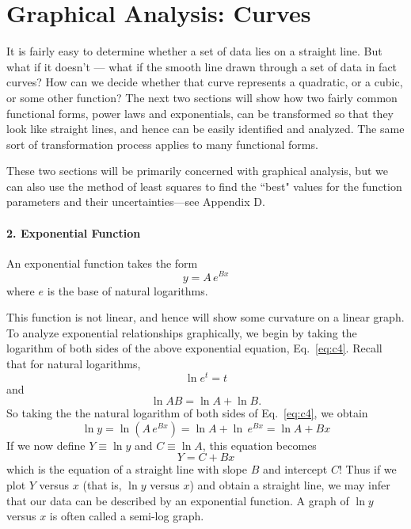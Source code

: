 \section*{Graphical Analysis: Curves}


    It is fairly easy to determine whether a set of data lies on
a straight line.  But what if it doesn't --- what if the smooth line
drawn through a set of data in fact curves?  How can we
decide whether that curve represents a quadratic, or a cubic, or
some other function?  The next two sections will show
how two fairly common functional forms, power laws and
exponentials, can be transformed so that they look like straight
lines, and hence can be easily identified and analyzed.  The
same sort of transformation process applies to many functional forms.

    These two sections will be primarily concerned with graphical
analysis, but we can also use the method of least squares to find the
``best" values for the function parameters and their
uncertainties---see Appendix D.

\paragraph*{2.  Exponential Function}
\label{exprel}
An exponential function takes the form
\begin{equation}
y = A\, e^{Bx}     \label{eq:c4}
\end{equation}
where $e$ is the base of natural logarithms.

This function is not linear, and hence will
show some curvature on a linear graph.
     To  analyze exponential relationships graphically, we
begin by taking the logarithm of both sides of  the above
exponential equation, Eq.~\ref{eq:c4}.
Recall that for natural logarithms,
\[
\ln e^{t}  = t
\]
and
\[
\ln AB = \ln A + \ln B .
\]
So taking the the natural logarithm of both sides of
Eq.~\ref{eq:c4}, we obtain
\begin{equation}
\ln y = \ln(A \, e^{Bx}) = \ln A + \ln \, e^{Bx}
   = \ln A + Bx   \label{eq:c5}
\end{equation}
If we now define $Y \equiv \ln y$ and $C \equiv \ln A$, this
equation becomes \[
Y = C + Bx
\]
which is the equation of a straight line with slope $B$ and
intercept $C$!  Thus if we plot $Y$ versus $x$ (that is,
$\ln y$ versus $x$) and obtain a straight line, we may infer that our
data can be described by an exponential function.  A graph of
$\ln y$ versus $x$ is often called a semi-log graph.


